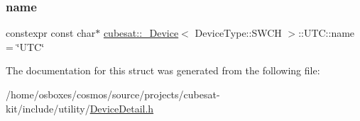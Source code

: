 \subsubsection{\texorpdfstring{name}{name}}
{\footnotesize\ttfamily constexpr const char$\ast$ \hyperlink{structcubesat_1_1__Device}{cubesat\+::\+\_\+\+Device}$<$ Device\+Type\+::\+S\+W\+CH $>$\+::U\+T\+C\+::name = \char`\"{}U\+TC\char`\"{}\hspace{0.3cm}{\ttfamily [static]}}



The documentation for this struct was generated from the following file\+:\begin{DoxyCompactItemize}
\item 
/home/osboxes/cosmos/source/projects/cubesat-\/kit/include/utility/\hyperlink{DeviceDetail_8h}{Device\+Detail.\+h}\end{DoxyCompactItemize}
